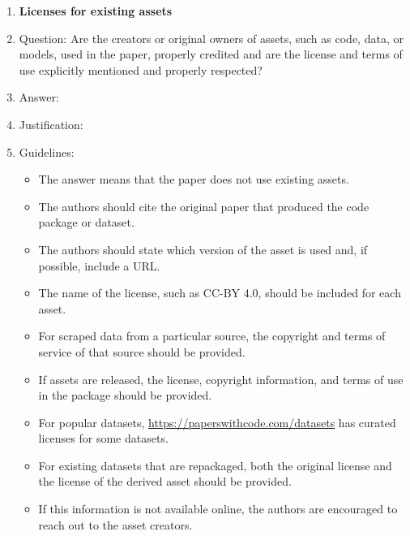 \begin{enumerate}
\item {\bf Licenses for existing assets}
    \item[] Question: Are the creators or original owners of assets, such as code, data, or models, used in the paper, properly credited and are the license and terms of use explicitly mentioned and properly respected?
    \item[] Answer: \answerTODO{}
    \item[] Justification: \justificationTODO{}
    \item[] Guidelines:
    \begin{itemize}
        \item The answer \answerNA{} means that the paper does not use existing assets.
        \item The authors should cite the original paper that produced the code package or dataset.
        \item The authors should state which version of the asset is used and, if possible, include a URL.
        \item The name of the license, such as CC-BY 4.0, should be included for each asset.
        \item For scraped data from a particular source, the copyright and terms of service of that source should be provided.
        \item If assets are released, the license, copyright information, and terms of use in the package should be provided.
        \item For popular datasets, \url{https://paperswithcode.com/datasets} has curated licenses for some datasets.
        \item For existing datasets that are repackaged, both the original license and the license of the derived asset should be provided.
        \item If this information is not available online, the authors are encouraged to reach out to the asset creators.
    \end{itemize}


\end{enumerate}
